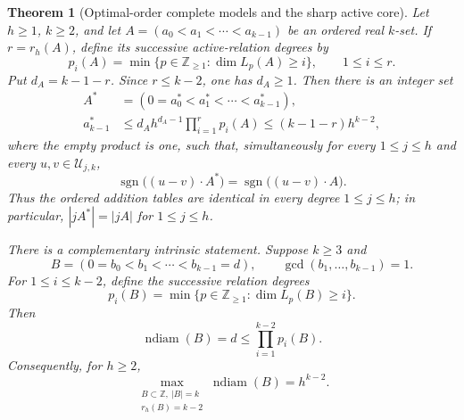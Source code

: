 \documentclass[11pt,reqno]{amsart}
\newtheorem{theorem}{Theorem}[section]
\theoremstyle{definition}
\theoremstyle{remark}
\newcommand{\ndiam}{\operatorname{ndiam}}
\begin{document}
\begin{theorem}[Optimal-order complete models and the sharp active core]
\label{thm:compression-master}
Let $h\geq1$, $k\geq2$, and let
$A=(a_0<a_1<\cdots<a_{k-1})$ be an ordered real $k$-set.  If
$r=r_h(A)$, define its successive active-relation degrees by
\[
 p_i(A)=\min\{p\in\mathbb Z_{\geq1}:\dim L_p(A)\geq i\},
 \qquad 1\leq i\leq r.
\]
Put $d_A=k-1-r$.  Since $r\leq k-2$, one has $d_A\geq1$.
Then there is an integer set
\[
 \begin{aligned}
 A^*&=(0=a_0^*<a_1^*<\cdots<a_{k-1}^*),\\
 a_{k-1}^*
 &\leq d_Ah^{d_A-1}\prod_{i=1}^{r}p_i(A)
 \leq(k-1-r)h^{k-2},
 \end{aligned}
\]
where the empty product is one,
such that, simultaneously for every $1\leq j\leq h$ and every
$u,v\in\mathcal U_{j,k}$,
\begin{equation}\label{eq:all-order-comparison}
 \operatorname{sgn}\bigl((u-v)\cdot A^*\bigr)
 =\operatorname{sgn}\bigl((u-v)\cdot A\bigr).
\end{equation}
Thus the ordered addition tables are identical in every degree $1\leq j\leq h$;
in particular, $|jA^*|=|jA|$ for $1\leq j\leq h$.

There is a complementary intrinsic statement.  Suppose $k\geq3$ and
\[
 B=(0=b_0<b_1<\cdots<b_{k-1}=d),
 \qquad \gcd(b_1,\ldots,b_{k-1})=1.
\]
For $1\leq i\leq k-2$, define the successive relation degrees
\[
 p_i(B)=\min\{p\in\mathbb Z_{\geq1}:\dim L_p(B)\geq i\}.
\]
Then
\begin{equation}\label{eq:successive-product-master}
 \ndiam(B)=d\leq\prod_{i=1}^{k-2}p_i(B).
\end{equation}
Consequently, for $h\geq2$,
\begin{equation}\label{eq:sharp-maximal-rank-core}
 \max_{\substack{B\subset\mathbb Z,\ |B|=k\\r_h(B)=k-2}}
       \ndiam(B)=h^{k-2}.
\end{equation}
\end{theorem}
\end{document}

